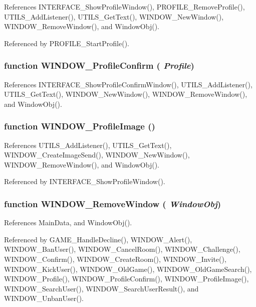 References INTERFACE\_\-ShowProfileWindow(), PROFILE\_\-RemoveProfile(), UTILS\_\-AddListener(), UTILS\_\-GetText(), WINDOW\_\-NewWindow(), WINDOW\_\-RemoveWindow(), and WindowObj().

Referenced by PROFILE\_\-StartProfile().
\subsubsection{\setlength{\rightskip}{0pt plus 5cm}function WINDOW\_\-ProfileConfirm ( {\em Profile})}\label{window_2window_8js_4372845882cf8427672379e1e923adef}




References INTERFACE\_\-ShowProfileConfirmWindow(), UTILS\_\-AddListener(), UTILS\_\-GetText(), WINDOW\_\-NewWindow(), WINDOW\_\-RemoveWindow(), and WindowObj().
\subsubsection{\setlength{\rightskip}{0pt plus 5cm}function WINDOW\_\-ProfileImage ()}\label{window_2window_8js_1c42b15fa0a4e852e46304ee51b506a8}




References UTILS\_\-AddListener(), UTILS\_\-GetText(), WINDOW\_\-CreateImageSend(), WINDOW\_\-NewWindow(), WINDOW\_\-RemoveWindow(), and WindowObj().

Referenced by INTERFACE\_\-ShowProfileWindow().
\subsubsection{\setlength{\rightskip}{0pt plus 5cm}function WINDOW\_\-RemoveWindow ( {\em WindowObj})}\label{window_2window_8js_f8f27008b4a8fe544068dc7db513ce47}




References MainData, and WindowObj().

Referenced by GAME\_\-HandleDecline(), WINDOW\_\-Alert(), WINDOW\_\-BanUser(), WINDOW\_\-CancelRoom(), WINDOW\_\-Challenge(), WINDOW\_\-Confirm(), WINDOW\_\-CreateRoom(), WINDOW\_\-Invite(), WINDOW\_\-KickUser(), WINDOW\_\-OldGame(), WINDOW\_\-OldGameSearch(), WINDOW\_\-Profile(), WINDOW\_\-ProfileConfirm(), WINDOW\_\-ProfileImage(), WINDOW\_\-SearchUser(), WINDOW\_\-SearchUserResult(), and WINDOW\_\-UnbanUser().
